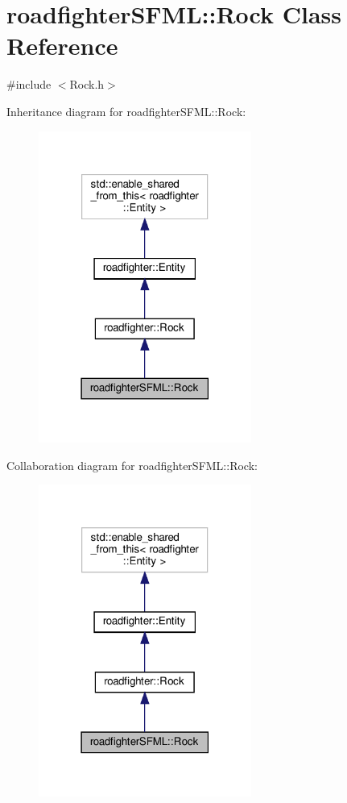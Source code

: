 \hypertarget{classroadfighterSFML_1_1Rock}{}\section{roadfighter\+S\+F\+ML\+:\+:Rock Class Reference}
\label{classroadfighterSFML_1_1Rock}


{\ttfamily \#include $<$Rock.\+h$>$}



Inheritance diagram for roadfighter\+S\+F\+ML\+:\+:Rock\+:\nopagebreak
\begin{figure}[H]
\begin{center}
\leavevmode
\includegraphics[width=198pt]{classroadfighterSFML_1_1Rock__inherit__graph}
\end{center}
\end{figure}


Collaboration diagram for roadfighter\+S\+F\+ML\+:\+:Rock\+:\nopagebreak
\begin{figure}[H]
\begin{center}
\leavevmode
\includegraphics[width=198pt]{classroadfighterSFML_1_1Rock__coll__graph}
\end{center}
\end{figure}

